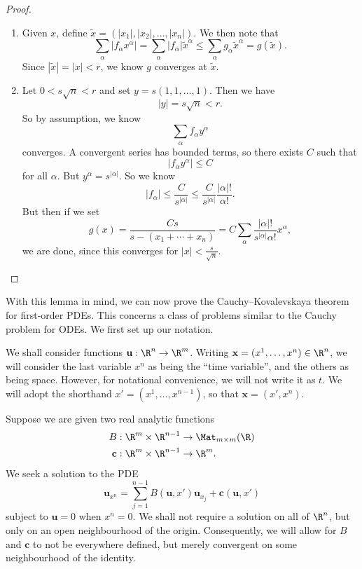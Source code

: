 \documentclass[a4paper]{article}
\begin{document}
\begin{proof}\leavevmode
  \begin{enumerate}
    \item Given $x$, define $\tilde{x} = (|x_1|, |x_2|, \ldots, |x_n|)$. We then note that
      \[
        \sum_\alpha |f_\alpha x^\alpha| = \sum_\alpha |f_\alpha| \tilde{x}^\alpha \leq \sum_\alpha g_\alpha \tilde{x}^\alpha = g(\tilde{x}).
      \]
      Since $|\tilde{x}| = |x| < r$, we know $g$ converges at $\tilde{x}$.
    \item Let $0 < s\sqrt{n} < r$ and set $y = s(1, 1, \ldots, 1)$. Then we have
      \[
        |y| = s \sqrt{n} < r.
      \]
      So by assumption, we know
      \[
        \sum_\alpha f_\alpha y^\alpha
      \]
      converges. A convergent series has bounded terms, so there exists $C$ such that
      \[
        |f_\alpha y^\alpha| \leq C
      \]
      for all $\alpha$. But $y^\alpha = s^{|\alpha|}$. So we know
      \[
        |f_\alpha| \leq \frac{C}{s^{|\alpha|}} \leq \frac{C}{s^{|\alpha|}} \frac{|\alpha|!}{\alpha!}.
      \]
      But then if we set
      \[
        g(x) = \frac{Cs}{s - (x_1 + \cdots + x_n)} = C \sum_\alpha \frac{|\alpha|!}{s^{|\alpha|}\alpha!} x^\alpha,
      \]
      we are done, since this converges for $|x| < \frac{s}{\sqrt{n}}$.\qedhere
  \end{enumerate}
\end{proof}

With this lemma in mind, we can now prove the Cauchy--Kovalevskaya theorem for first-order PDEs. This concerns a class of problems similar to the Cauchy problem for ODEs. We first set up our notation.

We shall consider functions $\mathbf{u}: \R^n \to \R^m$. Writing $\mathbf{x} = (x^1, \ldots, x^n) \in \R^n$, we will consider the last variable $x^n$ as being the ``time variable'', and the others as being space. However, for notational convenience, we will not write it as $t$. We will adopt the shorthand $x' = (x^1, \ldots, x^{n - 1})$, so that $\mathbf{x} = (x', x^n)$.

Suppose we are given two real analytic functions
\begin{align*}
  B: \R^m \times \R^{n - 1} &\to \Mat_{m \times m}(\R)\\
  \mathbf{c}: \R^m \times \R^{n - 1} &\to \R^m.
\end{align*}
We seek a solution to the PDE
\[
  \mathbf{u}_{x^n} = \sum_{j = 1}^{n - 1}B(\mathbf{u}, x') \mathbf{u}_{x_j} + \mathbf{c}(\mathbf{u}, x')
\]
subject to $\mathbf{u} = 0$ when $x^n = 0$. We shall not require a solution on all of $\R^n$, but only on an open neighbourhood of the origin. Consequently, we will allow for $B$ and $\mathbf{c}$ to not be everywhere defined, but merely convergent on some neighbourhood of the identity.
\end{document}
